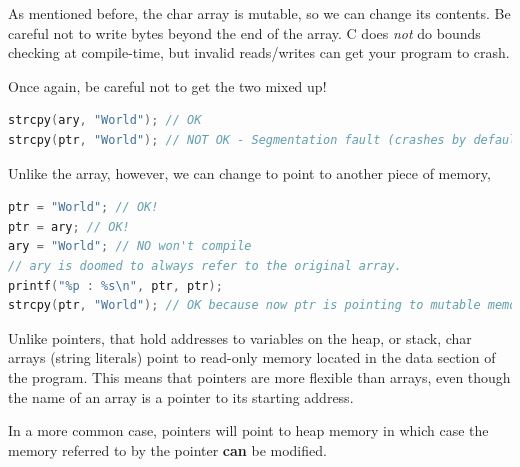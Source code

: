 As mentioned before, the char array is mutable, so we can change its contents.
Be careful not to write bytes beyond the end of the array. C does \emph{not} do bounds checking at compile-time, but invalid reads/writes can get your program to crash.

Once again, be careful not to get the two mixed up!

\begin{lstlisting}[language=C]
strcpy(ary, "World"); // OK
strcpy(ptr, "World"); // NOT OK - Segmentation fault (crashes by default; unless SIGSEGV is blocked)
\end{lstlisting}

Unlike the array, however, we can change  to point to another piece of memory,

\begin{lstlisting}[language=C]
ptr = "World"; // OK!
ptr = ary; // OK!
ary = "World"; // NO won't compile
// ary is doomed to always refer to the original array.
printf("%p : %s\n", ptr, ptr);
strcpy(ptr, "World"); // OK because now ptr is pointing to mutable memory (the array)
\end{lstlisting}

Unlike pointers, that hold addresses to variables on the heap, or stack, char arrays (string literals) point to read-only memory located in the data section of the program. This means that pointers are more flexible than arrays, even though the name of an array is a pointer to its starting address.

In a more common case, pointers will point to heap memory in which case the memory referred to by the pointer \textbf{can} be modified.


